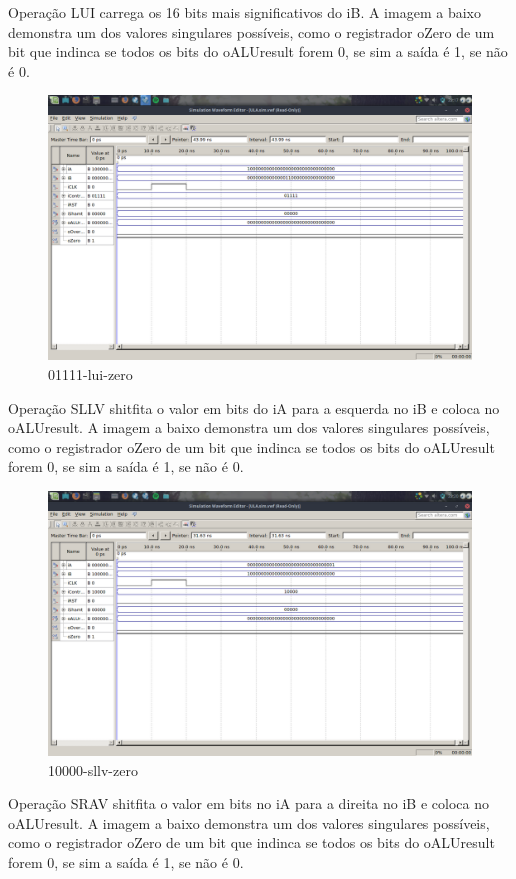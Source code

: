 \documentclass[12pt]{article}
\begin{document}
Operação LUI carrega os 16 bits mais significativos do iB.
A imagem a baixo demonstra um dos valores singulares possíveis, como o registrador oZero de um bit que indinca se todos os bits do oALUresult forem 0, se sim a saída é 1, se não é 0.
\begin{figure}[H]
	\centering
	\includegraphics[width=.8\textwidth]{01111-lui-zero.png}
	\caption{01111-lui-zero}
	\label{fig:01111-lui-zero}
\end{figure}
Operação SLLV shitfita o valor em bits do iA para a esquerda no iB e coloca no oALUresult.  
A imagem a baixo demonstra um dos valores singulares possíveis, como o registrador oZero de um bit que indinca se todos os bits do oALUresult forem 0, se sim a saída é 1, se não é 0.
\begin{figure}[H]
	\centering
	\includegraphics[width=.8\textwidth]{10000-sllv-zero.png}
	\caption{10000-sllv-zero}
	\label{fig:10000-sllv-zero}
\end{figure}
Operação SRAV shitfita o valor em bits no iA para a direita no iB e coloca no oALUresult. 
A imagem a baixo demonstra um dos valores singulares possíveis, como o registrador oZero de um bit que indinca se todos os bits do oALUresult forem 0, se sim a saída é 1, se não é 0.
\end{document}
